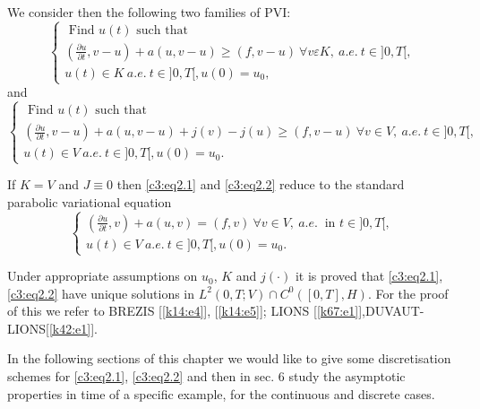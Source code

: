 We consider then the following two families of PVI:
\begin{equation*}
 \begin{cases}
\text{ Find } u(t) \text{ such that } \\ 
\left(\frac{\partial u} {\partial t}, v-u\right) +a (u, v-u) \geq (f,
v-u) \ \forall v \varepsilon K, ~ a.e. ~ t \in] 0,T [, \\ 
u (t) \in K  ~ a.e. ~ t \in ] 0, T [, u (0) = u_0, 
\end{cases}\tag{2.1}\label{c3:eq2.1}
\end{equation*}\pageoriginale 
and 
{\fontsize{10}{12}\selectfont
\begin{equation*}
 \begin{cases}
\text{ Find } u (t) \text{ such that }\\
(\frac{\partial u} {\partial t}, v-u) +a (u, v-u) + j (v) -j (u) \geq
(f, v-u) \ \forall v \in V, ~ a.e. ~ t \in] 0, T[, \\ 
u (t) \in V ~ a.e. ~ t \in ] 0, T [, u (0) = u_0. \tag{2.2}\label{c3:eq2.2} 
\end{cases}
\end{equation*}}\relax

\begin{remark}%
If $K =V$ and $J \equiv 0$ then \eqref{c3:eq2.1} and \eqref{c3:eq2.2}
reduce to the standard parabolic variational equation 
\begin{equation}
\begin{cases}
(\frac{\partial u} {\partial t}, v) +a (u, v) = (f, v) \ \forall v \in
  V, ~ a.e. ~ \text{ in } t \in] 0, T[, \\ 
    u (t) \in V ~ a.e. ~ t \in ] 0, T [, u (0) = u_0. \tag{2.3}\label{c3:eq2.3}
\end{cases}
\end{equation}
\end{remark}

Under appropriate assumptions on $u_0$, $K$ and $j (\cdot)$ it is
proved that \eqref{c3:eq2.1}, \eqref{c3:eq2.2} have unique solutions
in $L^2 (0,T; V) \cap C^0 ([0, T], H)$. For the proof of this we refer
to BREZIS [\ref{k14:e4}], [\ref{k14:e5}]; LIONS
[\ref{k67:e1}],DUVAUT-LIONS[\ref{k42:e1}]. 

 In the following sections of this chapter we would like to give some
 discretisation schemes for \eqref{c3:eq2.1},  \eqref{c3:eq2.2} and
 then in sec. 6 study the asymptotic properties in time of a specific
 example, for the continuous and discrete cases. 

